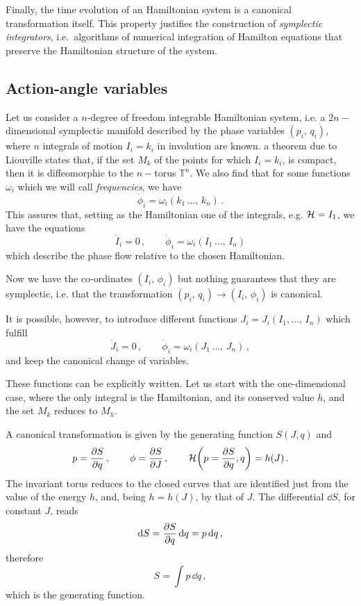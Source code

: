 Finally, the time evolution of an Hamiltonian system is a canonical transformation itself. This property justifies the construction of \textit{symplectic integrators}, i.e.\ algorithms of numerical integration of Hamilton equations that preserve the Hamiltonian structure of the system.


\subsection{Action-angle variables}

Let us consider a $n$-degree of freedom integrable Hamiltonian system, i.e. a $2n-$dimensional symplectic manifold described by the phase variables $(p_i,\,q_i)$, where $n$ integrals of motion $I_i=k_i$ in involution are known. a theorem due to Liouville states that, if the set $M_{k}$ of the points for which $I_i=k_i$, is compact, then it is diffeomorphic to the $n-$torus $\mathbb{T}^n$. We also find that for some functions $\omega_i$ which we will call \textit{frequencies}, we have
%
\begin{equation} \dot{\phi}_i = \omega_i(k_1\,\dots,\,k_n)\,. \end{equation}
%
This assures that, setting as the Hamiltonian one of the integrals, e.g. $\mathcal{H}=I_1$, we have the equations
%
\begin{equation} \dot I_i = 0\,, \qquad \dot \phi_i = \omega_i(I_1\,\dots,\,I_n)  \end{equation} 
%
which describe the phase flow relative to the chosen Hamiltonian.

Now we have the co-ordinates $(I_i,\,\phi_i)$ but nothing guarantees that they are symplectic, i.e. that the transformation $(p_i,\,q_i)\to(I_i,\,\phi_i)$ is canonical.

It is possible, however, to introduce different functions $J_i = J_i(I_1,\dots,\,I_n)$ which fulfill
%
\begin{equation} \dot J_i = 0\,, \qquad \dot \phi_i = \omega_i(J_1\,\dots,\,J_n)\,,  \end{equation} 
%
and keep the canonical change of variables.

These functions can be explicitly written. Let us start with the one-di\-men\-sio\-nal case, where the only integral is the Hamiltonian, and its conserved value $h$, and the set $M_k$ reduces to $M_h$.

A canonical transformation is given by the generating function $S(J,q)$ and
%
\begin{equation}
  p=\pdv{S}{q}\,, \qquad \phi=\pdv{S}{J}\,, \qquad \mathcal{H}\qty(p=\pdv{S}{q},q) = h(J)\,.
  \label{eq:transf1}
  \end{equation} 
%
The invariant torus reduces to the closed curves that are identified just from the value of the energy $h$, and, being $h=h(J)$, by that of $J$. The differential $\dd S$, for constant $J$, reads
%
\begin{equation}  \dd S = \pdv{S}{q}\,\dd q = p\,\dd q\,,
\end{equation} 
%
therefore
%
\begin{equation} S = \int p\, \dd q\,,
\label{eq:S}
\end{equation} 
%
which is the generating function.

